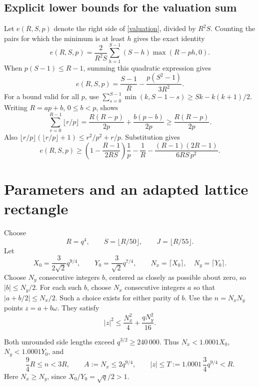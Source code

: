 \documentclass[11pt]{article}
\begin{document}
\subsection{Explicit lower bounds for the valuation sum}

Let \(e(R,S,p)\) denote the right side of \eqref{valuation}, divided
by \(R^2S\). Counting the pairs for which the minimum is at least
\(h\) gives the exact identity
\begin{equation}\label{layers}
 e(R,S,p)=\frac2{R^2S}
 \sum_{h=1}^{S-1}(S-h)\max(R-ph,0).
\end{equation}
When \(p(S-1)\le R-1\), summing this quadratic expression gives
\begin{equation}\label{small-e}
 e(R,S,p)=\frac{S-1}{R}-\frac{p(S^2-1)}{3R^2}.
\end{equation}
For a bound valid for all \(p\), use
\(\sum_{s=0}^{S-1}\min(k,S-1-s)\ge Sk-k(k+1)/2\).
Writing \(R=ap+b\), \(0\le b<p\), shows
\[
 \sum_{r=0}^{R-1}\lfloor r/p\rfloor
 =\frac{R(R-p)}{2p}+\frac{b(p-b)}{2p}
 \ge\frac{R(R-p)}{2p}.
\]
Also \(\lfloor r/p\rfloor(\lfloor r/p\rfloor+1)
\le r^2/p^2+r/p\). Substitution gives
\begin{equation}\label{tail-e}
 e(R,S,p)\ge
 \left(1-\frac{R-1}{2RS}\right)\frac1p
 -\frac1R-\frac{(R-1)(2R-1)}{6RS\,p^2}.
\end{equation}

\section{Parameters and an adapted lattice rectangle}\label{params}

Choose
\begin{equation}\label{parameters}
 R=q^4,\qquad S=\lfloor R/50\rfloor,\qquad
 J=\lfloor R/55\rfloor.
\end{equation}
Let
\[
 X_0=\frac{3}{2\sqrt2}q^{9/4},\qquad
 Y_0=\frac{3}{\sqrt2}q^{7/4},\qquad
 N_x=\lceil X_0\rceil,\quad N_y=\lceil Y_0\rceil.
\]
Choose \(N_y\) consecutive integers \(b\), centered as closely as
possible about zero, so \(|b|\le N_y/2\). For each such \(b\), choose
\(N_x\) consecutive integers \(a\) so that
\(|a+b/2|\le N_x/2\). Such a choice exists for either parity of \(b\).
Use the \(n=N_xN_y\) points \(z=a+b\omega\).
They satisfy
\begin{equation}\label{point-size}
 |z|^2\le\frac{N_x^2}{4}+\frac{qN_y^2}{16}.
\end{equation}

Both unrounded side lengths exceed \(q^{3/2}\ge240\,000\). Thus
\(N_x<1.0001X_0\), \(N_y<1.0001Y_0\), and
\begin{equation}\label{grid-bounds}
 \frac94R\le n<3R,\qquad
 A:=N_x\le2q^{9/4},\qquad
 |z|\le T:=1.0001\,\frac34q^{9/4}<R.
\end{equation}
Here \(N_x\ge N_y\), since \(X_0/Y_0=\sqrt q/2>1\).
\end{document}
